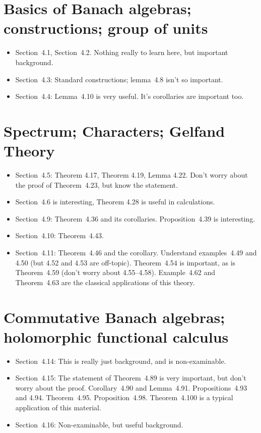 \documentclass[twoside,12pt,a4paper]{article}
\begin{document}
\section{Basics of Banach algebras; constructions; group of units}

\begin{itemize}
\item Section~4.1, Section~4.2.  Nothing really to learn here, but
important background.
\item Section~4.3: Standard constructions; lemma~4.8 isn't so important.
\item Section~4.4: Lemma~4.10 is very useful.  It's corollaries are important
too.
\end{itemize}


\section{Spectrum; Characters; Gelfand Theory}

\begin{itemize}
\item Section~4.5: Theorem 4.17, Theorem 4.19, Lemma 4.22.  Don't worry about
the proof of Theorem~4.23, but know the statement.
\item Section~4.6 is interesting, Theorem 4.28 is useful in calculations.
\item Section~4.9: Theorem~4.36 and its corollaries.  Proposition~4.39 is
interesting.
\item Section~4.10: Theorem~4.43.
\item Section~4.11: Theorem~4.46 and the corollary.  Understand examples~4.49
and 4.50 (but 4.52 and 4.53 are off-topic).  Theorem~4.54 is important,
as is Theorem~4.59 (don't worry about 4.55--4.58).  Example~4.62 and
Theorem~4.63 are the classical applications of this theory.
\end{itemize}


\section{Commutative Banach algebras; holomorphic functional calculus}

\begin{itemize}
\item Section~4.14: This is really just background, and is non-examinable.
\item Section~4.15: The statement of Theorem~4.89 is very important, but
don't worry about the proof.  Corollary~4.90 and Lemma~4.91.
Propositions~4.93 and 4.94.  Theorem~4.95.  Proposition~4.98.
Theorem~4.100 is a typical application of this material.
\item Section~4.16: Non-examinable, but useful background.
\end{itemize}
\end{document}
